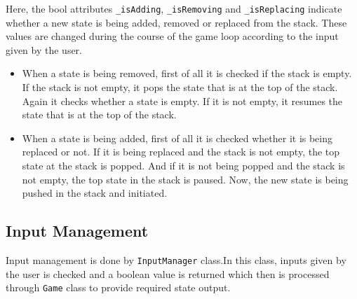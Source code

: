 \documentclass[main]{subfiles}
\begin{document}
Here, the bool attributes \texttt{\_isAdding}, \texttt{\_isRemoving} and \texttt{\_isReplacing} indicate whether a new state is being added, removed or replaced from the stack. These values are changed during the course of the game loop according to the input given by the user.
\begin{itemize}
    \item When a state is being removed, first of all it is checked if the stack is empty. If the stack is not empty, it pops the state that is at the top of the stack. Again it checks whether a state is empty. If it is not empty, it resumes the state that is at the top of the stack.
    \item When a state is being added, first of all it is checked whether it is being replaced or not. If it is being replaced and the stack is not empty, the top state at the stack is popped. And if it is not being popped and the stack is not empty, the top state in the stack is paused. Now, the new state is being pushed in the stack and initiated. 
\end{itemize}


\subsection{Input Management}
Input management is done by \texttt{InputManager} class.In this class, inputs given by the user is checked and a boolean value is returned which then is processed through \texttt{Game} class to provide required state output.
\end{document}
